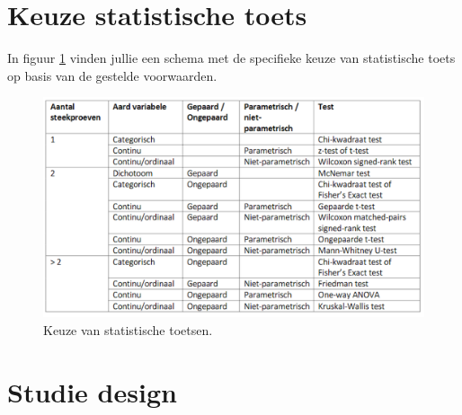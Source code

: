 \documentclass[
]{book}
\theoremstyle{definition}
\theoremstyle{definition}
\theoremstyle{definition}
\theoremstyle{definition}
\theoremstyle{remark}
\begin{document}
\hypertarget{keuze-statistische-toets}{%
\section*{Keuze statistische toets}\label{keuze-statistische-toets}}


In figuur \ref{fig:stattest} vinden jullie een schema met de specifieke keuze van statistische toets op basis van de gestelde voorwaarden.

\begin{figure}
\includegraphics[width=1\linewidth]{img/stat_test} \caption{Keuze van statistische toetsen.}\label{fig:stattest}
\end{figure}

\hypertarget{studie-design}{%
\section*{Studie design}\label{studie-design}}
\end{document}

